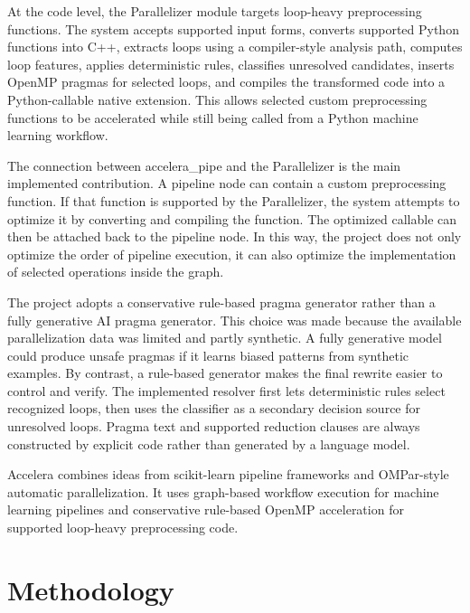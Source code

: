 \documentclass[12pt,a4paper,oneside]{report}
\begin{document}
At the code level, the Parallelizer module targets loop-heavy preprocessing
functions. The system accepts supported input forms, converts supported Python
functions into C++, extracts loops using a compiler-style analysis path, computes
loop features, applies deterministic rules, classifies unresolved candidates,
inserts OpenMP pragmas for selected loops, and compiles the transformed code into a
Python-callable native extension. This allows selected custom preprocessing
functions to be accelerated while still being called from a Python machine
learning workflow.

The connection between accelera\_pipe and the Parallelizer is the main
implemented contribution. A pipeline node can contain a custom preprocessing
function. If that function is supported by the Parallelizer, the system attempts
to optimize it by converting and compiling the function. The optimized callable
can then be attached back to the pipeline node. In this way, the project does
not only optimize the order of pipeline execution, it can also optimize the
implementation of selected operations inside the graph.

The project adopts a conservative rule-based pragma generator rather than a
fully generative AI pragma generator. This choice was made because the available
parallelization data was limited and partly synthetic. A fully generative model
could produce unsafe pragmas if it learns biased patterns from synthetic
examples. By contrast, a rule-based generator makes the final rewrite easier to
control and verify. The implemented resolver first lets deterministic rules
select recognized loops, then uses the classifier as a secondary decision source
for unresolved loops. Pragma text and supported reduction clauses are always
constructed by explicit code rather than generated by a language model.

Accelera combines ideas from scikit-learn pipeline frameworks and OMPar-style automatic parallelization. 
It uses graph-based workflow execution for machine learning pipelines and conservative rule-based OpenMP 
acceleration for supported loop-heavy preprocessing code.


\chapter{Methodology}
\label{chap:methodology}

\end{document}
